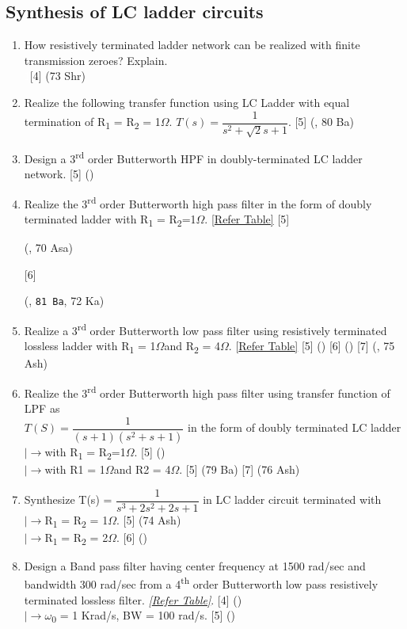 \documentclass[12pt]{article}
\newcommand{\W}{\(\Omega\)}
\newcommand{\w}{\(\omega\)}
\newcommand{\lb}{\\$\left|\rightarrow\right.$}
\newcommand{\enter}{\\\textcolor{white}{1}}
\newcommand{\sub}[1]{\textsubscript{#1}}
\newcommand{\super}[1]{\textsuperscript{#1}}
\begin{document}
	\subsection{Synthesis of LC ladder circuits }
		\begin{enumerate}
			\item How resistively terminated ladder network can be realized with finite transmission zeroes? Explain.
			\enter\hfill [4] (73 Shr)

			\item Realize the following transfer function using LC Ladder with equal termination of R\sub{1} = R\sub{2} = 1\W. $T(s) = \dfrac{1}{s^2+\sqrt{2}s+1}$. \hfill [5] (, 80 Ba)
			
			\item Design a 3\super{rd} order Butterworth HPF in doubly-terminated LC ladder network. \hfill [5] ()
			
			\item Realize the 3\super{rd} order Butterworth high pass filter in the form of doubly terminated ladder with R\sub{1} = R\sub{2}=1\W. {[\hyperref[sec:tables_81ba]{Refer Table]}} \hfill [5] \begin{footnotesize} (, 70 Asa) \end{footnotesize} [6] \begin{footnotesize} (, \texttt{81 Ba}, 72 Ka) \end{footnotesize}

			\item Realize a 3\super{rd} order Butterworth low pass filter using resistively terminated lossless ladder with R\sub{1} = 1\W and R\sub{2} = 4\W. {[\hyperref[sec:tables_81ba]{Refer Table]}} \hfill [5] () [6] () [7] (, 75 Ash)

			\item Realize the 3\super{rd} order Butterworth high pass filter using transfer function of LPF as\\ $T(S)= \dfrac{1}{(s+1)(s^2+s+1)}$ in the form of doubly terminated LC ladder
			\lb with R\sub{1} = R\sub{2}=1\W. \hfill [5] ()
			\lb with R1 = 1\W and R2 = 4\W.  \hfill [5] (79 Ba)	[7] (76 Ash)
			
			\item Synthesize T(s) = $\dfrac{1}{s^3+2s^2+2s+1}$ in LC ladder circuit terminated with
			\lb R\sub{1} = R\sub{2} = 1\W. \hfill [5] (74 Ash)
			\lb R\sub{1} = R\sub{2} = 2\W. \hfill [6] ()
			
			\item Design a Band pass filter having center frequency at 1500 rad/sec and bandwidth 300 rad/sec from a 4\textsuperscript{th} order Butterworth low pass resistively terminated lossless filter. \textit{[\hyperref[sec:tables_81bh]{Refer Table]}}. \hfill [4] ()
			\lb \w \textsubscript{0} = 1 Krad/s, BW = 100 rad/s. \hfill [5] ()
		\end{enumerate}
\end{document}
